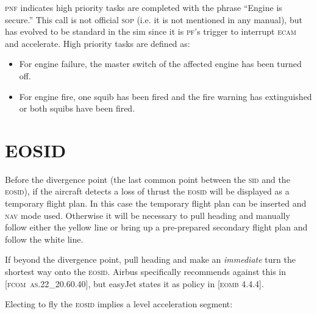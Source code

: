 \documentclass[a5paper,11pt,twoside]{book}
\newcommand{\inlcite}[1]{{\footnotesize\scshape\MakeLowercase{[#1]}}}
\newcommand{\multicite}[1]{%

  \nopagebreak
  \noindent{{\color{blue}\inlcite{#1}}}
}
\newcommand{\ac}[1]{{\scshape\MakeLowercase{#1}}}
\begin{document}
\ac{PNF} indicates high priority tasks are completed with the phrase ``Engine is
secure.''  This call is not official \ac{SOP} (i.e. it is not mentioned in any
manual), but has evolved to be standard in the sim since it is \ac{PF}'s trigger
to interrupt \ac{ECAM} and accelerate.  High priority tasks are defined as:

\begin{itemize}
\item For engine failure, the master switch of the affected engine has been
  turned off.

\item For engine fire, one squib has been fired and the fire warning has
  extinguished or both squibs have been fired.
\end{itemize}

\multicite{FCTM~PRO.AEP.ENG}


\section{EOSID}

Before the divergence point (the last common point between the \ac{SID} and the
\ac{EOSID}), if the aircraft detects a loss of thrust the \ac{EOSID} will be
displayed as a temporary flight plan. In this case the temporary flight plan can
be inserted and \ac{NAV} mode used. Otherwise it will be necessary to pull
heading and manually follow either the yellow line or bring up a pre-prepared
secondary flight plan and follow the white line.

If beyond the divergence point, pull heading and make an \emph{immediate} turn
the shortest way onto the \ac{EOSID}. Airbus specifically recommends against
this in \inlcite{FCOM~AS.22\_20.60.40}, but easyJet states it as policy in
\inlcite{EOMB 4.4.4}.

Electing to fly the \ac{EOSID} implies a level acceleration segment:
\end{document}
